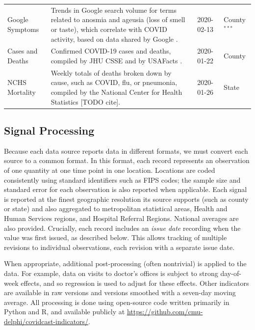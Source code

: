 \documentclass[9pt,twocolumn,twoside,lineno]{pnas-new}
\begin{document}
\begin{table}
\begin{tabular}{>{\raggedright}p{1.2in} p{4.0in} l >{\raggedright\arraybackslash}p{0.5in}}
  Google Symptoms & Trends in Google search volume for terms related to anosmia
and ageusia (loss of smell or taste), which correlate with COVID activity, based
on data shared by Google \cite{GoogleSymptoms}. & 2020-02-13 & County$^{***}$ \\
  Cases and Deaths & Confirmed COVID-19 cases and deaths, compiled by JHU CSSE
\cite{Dong:2020} and by USAFacts \cite{USAFacts}. & 2020-01-22 & County \\
  NCHS Mortality & Weekly totals of deaths broken down by cause, such as COVID,
flu, or pneumonia, compiled by the National Center for Health Statistics [TODO
cite]. & 2020-01-26 & State \\
    \bottomrule
\end{tabular}
\label{data-sources}
\end{table}

\subsection{Signal Processing}

Because each data source reports data in different formats, we must convert each
source to a common format. In this format, each record represents an observation
of one quantity at one time point in one location. Locations are coded
consistently using standard identifiers such as FIPS codes; the sample size and
standard error for each observation is also reported when applicable. Each
signal is reported at the finest geographic resolution its source supports (such
as county or state) and also aggregated to metropolitan statistical areas,
Health and Human Services regions, and Hospital Referral Regions. National
averages are also provided. Crucially, each record includes an \textit{issue
  date} recording when the value was first issued, as described below. This
allows tracking of multiple revisions to individual observations, each revision
with a separate issue date.

When appropriate, additional post-processing (often nontrivial) is applied to
the data. For example, data on visits to doctor's offices is subject to strong
day-of-week effects, and so regression is used to adjust for these
effects. Other indicators are available in raw versions and versions smoothed
with a seven-day moving average. All processing is done using open-source code
written primarily in Python and R, and available publicly at
\url{https://github.com/cmu-delphi/covidcast-indicators/}.
\end{document}
